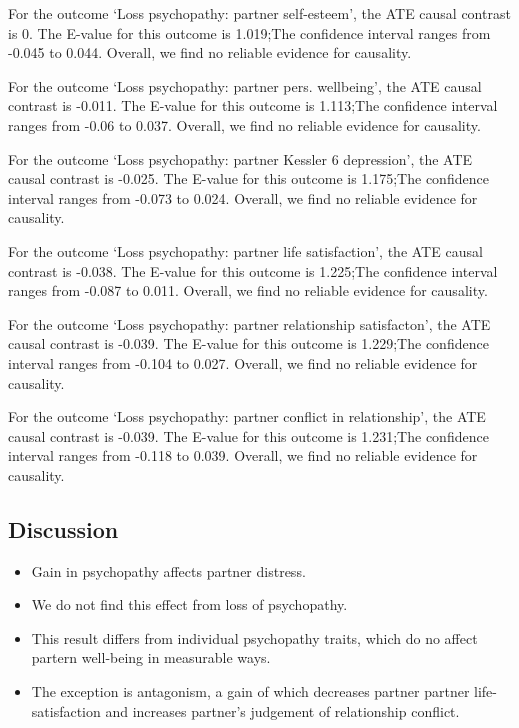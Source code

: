 \documentclass[
  singlecolumn]{article}
\providecommand{\tightlist}{%
  \setlength{\itemsep}{0pt}\setlength{\parskip}{0pt}}\usepackage{longtable,booktabs,array}
\begin{document}
For the outcome `Loss psychopathy: partner self-esteem', the ATE causal
contrast is 0. The E-value for this outcome is 1.019;The confidence
interval ranges from -0.045 to 0.044. Overall, we find no reliable
evidence for causality.

For the outcome `Loss psychopathy: partner pers. wellbeing', the ATE
causal contrast is -0.011. The E-value for this outcome is 1.113;The
confidence interval ranges from -0.06 to 0.037. Overall, we find no
reliable evidence for causality.

For the outcome `Loss psychopathy: partner Kessler 6 depression', the
ATE causal contrast is -0.025. The E-value for this outcome is 1.175;The
confidence interval ranges from -0.073 to 0.024. Overall, we find no
reliable evidence for causality.

For the outcome `Loss psychopathy: partner life satisfaction', the ATE
causal contrast is -0.038. The E-value for this outcome is 1.225;The
confidence interval ranges from -0.087 to 0.011. Overall, we find no
reliable evidence for causality.

For the outcome `Loss psychopathy: partner relationship satisfacton',
the ATE causal contrast is -0.039. The E-value for this outcome is
1.229;The confidence interval ranges from -0.104 to 0.027. Overall, we
find no reliable evidence for causality.

For the outcome `Loss psychopathy: partner conflict in relationship',
the ATE causal contrast is -0.039. The E-value for this outcome is
1.231;The confidence interval ranges from -0.118 to 0.039. Overall, we
find no reliable evidence for causality.

\subsection{Discussion}\label{discussion}

\begin{itemize}
\tightlist
\item
  Gain in psychopathy affects partner distress.
\item
  We do not find this effect from loss of psychopathy.
\item
  This result differs from individual psychopathy traits, which do no
  affect partern well-being in measurable ways.
\item
  The exception is antagonism, a gain of which decreases partner partner
  life-satisfaction and increases partner's judgement of relationship
  conflict.
\end{itemize}
\end{document}
